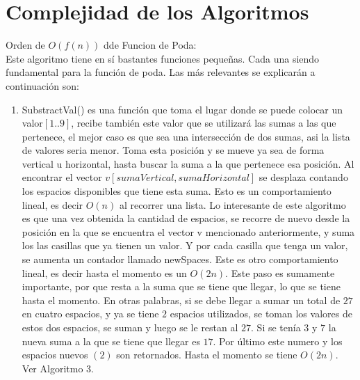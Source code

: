 \documentclass[conference]{IEEEtran}
\begin{document}
\section{Complejidad de los Algoritmos}
Orden de $O(f(n))$ dde Funcion de Poda:\\
Este algoritmo tiene en s\'i bastantes funciones  pequeñas. Cada una siendo fundamental para la funci\'on de poda. Las m\'as relevantes se explicar\'an a continuaci\'on son:\\
\begin{enumerate}[I]
\item SubstractVal() es una funci\'on que toma el lugar donde se puede colocar un valor$[1..9]$, recibe tambi\'en este valor que se utilizar\'a las sumas a las que pertenece, el mejor caso es que sea una intersecci\'on de dos sumas, asi la lista de valores seria menor. Toma esta posici\'on y se mueve ya sea de forma vertical u horizontal, hasta buscar la suma a la que pertenece esa posici\'on. Al encontrar el vector $v[sumaVertical,sumaHorizontal]$ se desplaza contando los espacios disponibles que tiene esta suma.  Esto es un comportamiento lineal, es decir $O(n)$ al recorrer una lista. Lo interesante de este algoritmo es que una vez obtenida la cantidad de espacios, se recorre de nuevo desde la posici\'on en la que se encuentra el vector v mencionado anteriormente, y suma los las casillas que ya tienen  un valor. Y por cada casilla que tenga un valor, se aumenta un contador llamado newSpaces. Este es otro comportamiento lineal, es decir hasta el momento es un $O(2n)$. Este paso es sumamente importante, por que resta a la suma que se tiene que llegar, lo que se tiene hasta el momento. En otras palabras, si se debe llegar a sumar un total de $27$ en cuatro espacios, y ya se tiene $2$ espacios utilizados, se toman los valores de estos dos espacios, se suman y luego se le restan al $27$. Si se ten\'ia $3$ y $7$ la nueva suma a la que se tiene que llegar es $17$. Por \'ultimo este numero y los espacios nuevos  $(2)$ son retornados. Hasta el momento se tiene $O(2n)$. \\
Ver Algoritmo 3. 

\end{enumerate}
\end{document}
